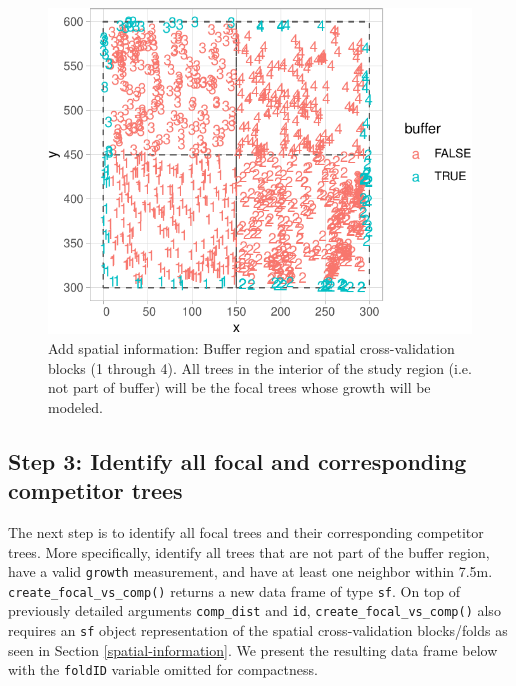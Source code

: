 \documentclass[12pt]{article}
\begin{document}
\begin{figure}

{\centering \includegraphics[width=0.66\linewidth]{Figures/scbi-spatial-information-1} 

}

\caption{Add spatial information: Buffer region and spatial cross-validation blocks (1 through 4). All trees in the interior of the study region (i.e. not part of buffer) will be the focal trees whose growth will be modeled.}\label{fig:scbi-spatial-information}
\end{figure}

\hypertarget{focal-vs-comp}{%
\subsection{Step 3: Identify all focal and corresponding competitor
trees}\label{focal-vs-comp}}

The next step is to identify all focal trees and their corresponding
competitor trees. More specifically, identify all trees that are not
part of the buffer region, have a valid \texttt{growth} measurement, and
have at least one neighbor within 7.5m.
\texttt{create\_focal\_vs\_comp()} returns a new data frame of type
\texttt{sf}. On top of previously detailed arguments \texttt{comp\_dist}
and \texttt{id}, \texttt{create\_focal\_vs\_comp()} also requires an
\texttt{sf} object representation of the spatial cross-validation
blocks/folds as seen in Section \ref{spatial-information}. We present
the resulting data frame below with the \texttt{foldID} variable omitted
for compactness.
\end{document}
